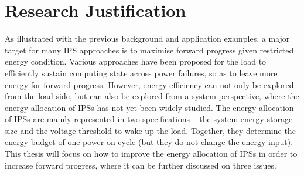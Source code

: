 \section{Research Justification}


As illustrated with the previous background and application examples, a major target for many IPS approaches is to maximise forward progress given restricted energy condition. 
Various approaches have been proposed for the load to efficiently sustain computing state across power failures, so as to leave more energy for forward progress. 
However, energy efficiency can not only be explored from the load side, but can also be explored from a system perspective, where the energy allocation of IPSs has not yet been widely studied. 
The energy allocation of IPSs are mainly represented in two specifications -- the system energy storage size and the voltage threshold to wake up the load. 
Together, they determine the energy budget of one power-on cycle (but they do not change the energy input). 
This thesis will focus on how to improve the energy allocation of IPSs in order to increase forward progress, where it can be further discussed on three issues. 


